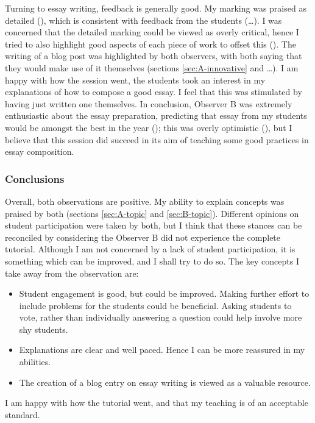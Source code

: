 Turning to essay writing, feedback is generally good. My marking was praised as detailed (), which is consistent with feedback from the students (\ldots). I was concerned that the detailed marking could be viewed as overly critical, hence I tried to also highlight good aspects of each piece of work to offset this  (). The writing of a blog post was highlighted by both observers, with both saying that they would make use of it themselves (sections \ref{sec:A-innovative} and \ldots). I am happy with how the session went, the students took an interest in my explanations of how to compose a good essay. I feel that this was stimulated by having just written one themselves. In conclusion, Observer B was extremely enthusiastic about the essay preparation, predicting that essay from my students would be amongst the best in the year (); this was overly optimistic (), but I believe that this session did succeed in its aim of teaching some good practices in essay composition.


\subsubsection{Conclusions}

Overall, both observations are positive. My ability to explain concepts was praised by both (sections \ref{sec:A-topic} and \ref{sec:B-topic}). Different opinions on student participation were taken by both, but I think that these stances can be reconciled by considering the Observer B did not experience the complete tutorial. Although I am not concerned by a lack of student participation, it is something which can be improved, and I shall try to do so. The key concepts I take away from the observation are:
\begin{itemize}
\item Student engagement is good, but could be improved. Making further effort to include problems for the students could be beneficial. Asking students to vote, rather than individually answering a question could help involve more shy students.
\item Explanations are clear and well paced. Hence I can be more reassured in my abilities.
\item The creation of a blog entry on essay writing is viewed as a valuable resource.
\end{itemize}
I am happy with how the tutorial went, and that my teaching is of an acceptable standard.

